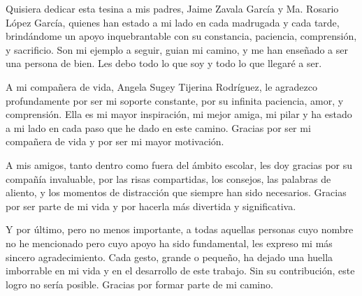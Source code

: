 Quisiera dedicar esta tesina a mis padres, Jaime Zavala García y Ma. Rosario López García, quienes han estado a mi lado en cada madrugada y cada tarde, brindándome un apoyo inquebrantable con su constancia, paciencia, comprensión, y sacrificio. Son mi ejemplo a seguir, guian mi camino, y me han enseñado a ser una persona de bien. Les debo todo lo que soy y todo lo que llegaré a ser.

A mi compañera de vida, Angela Sugey Tijerina Rodríguez, le agradezco profundamente por ser mi soporte constante, por su infinita paciencia, amor, y comprensión. Ella es mi mayor inspiración, mi mejor amiga, mi pilar y ha estado a mi lado en cada paso que he dado en este camino. Gracias por ser mi compañera de vida y por ser mi mayor motivación.

A mis amigos, tanto dentro como fuera del ámbito escolar, les doy gracias por su compañía invaluable, por las risas compartidas, los consejos, las palabras de aliento, y los momentos de distracción que siempre han sido necesarios. Gracias por ser parte de mi vida y por hacerla más divertida y significativa.

Y por último, pero no menos importante, a todas aquellas personas cuyo nombre no he mencionado pero cuyo apoyo ha sido fundamental, les expreso mi más sincero agradecimiento. Cada gesto, grande o pequeño, ha dejado una huella imborrable en mi vida y en el desarrollo de este trabajo. Sin su contribución, este logro no sería posible. Gracias por formar parte de mi camino.
